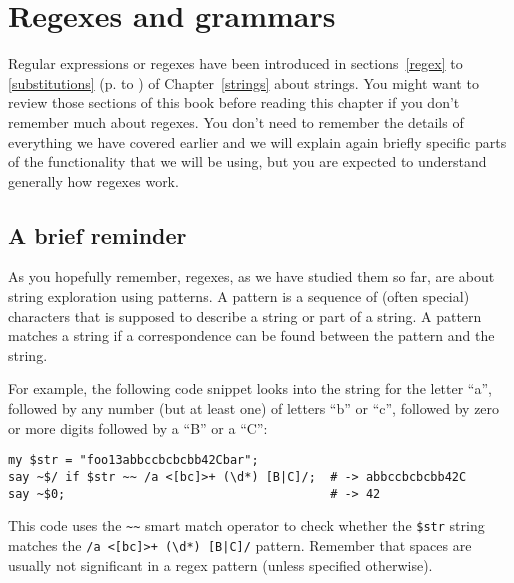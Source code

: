 


\chapter{Regexes and grammars}
\label{regex_grammars}

Regular expressions or regexes have been introduced in 
sections~\ref{regex} to \ref{substitutions} (p. \pageref{regex} 
to \pageref{regex_adverbs}) of Chapter~\ref{strings} 
about strings. You might want to review those sections 
of this book before reading this chapter if you don't 
remember much about regexes. You don't need to remember the 
details of everything we have covered earlier and we will explain 
again briefly specific parts of the functionality that we 
will be using, but you are expected to understand generally 
how regexes work.

\section{A brief reminder}

As you hopefully remember, regexes, as we have studied 
them so far, are about string exploration using patterns. 
A pattern is a sequence of (often special) characters that 
is supposed to describe a string or part of a string. A 
pattern matches a string if a correspondence can be found 
between the pattern and the string. 

For example, the 
following code snippet looks into the string for the letter 
``a'', followed by any number (but at least one) of letters 
``b'' or ``c'', followed by zero or more digits followed by
a ``B'' or a ``C'':

\begin{verbatim}
my $str = "foo13abbccbcbcbb42Cbar";
say ~$/ if $str ~~ /a <[bc]>+ (\d*) [B|C]/;  # -> abbccbcbcbb42C
say ~$0;                                     # -> 42
\end{verbatim}

This code uses the \verb'~~' smart match operator to 
check whether the \verb'$str' string matches the 
\verb'/a <[bc]>+ (\d*) [B|C]/' pattern. Remember that 
spaces are usually not significant in a regex pattern 
(unless specified otherwise).

